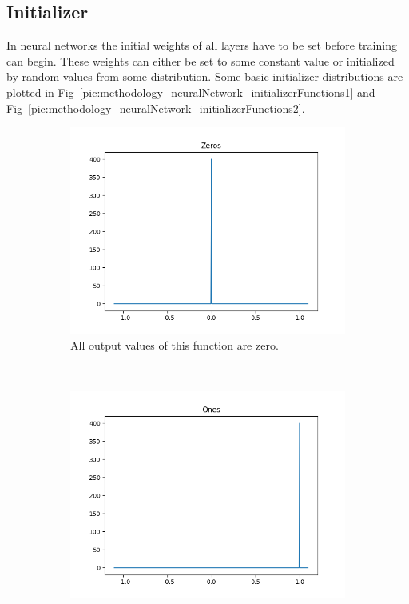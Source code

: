 \newpage

\subsection{Initializer}
In neural networks the initial weights of all layers have to be set before training can begin. These weights can either be set to some constant value or initialized by random values from some distribution. Some basic initializer distributions are plotted in Fig~\ref{pic:methodology_neuralNetwork_initializerFunctions1} and Fig~\ref{pic:methodology_neuralNetwork_initializerFunctions2}.

\newpage

\begin{figure}[h!]
	\centering
	\begin{subfigure}[t]{0.5\textwidth}
		\centering
		\includegraphics[width=\textwidth]{img/methodology_neuralNetwork_initializerFunctions_zeros.png}
		\caption{All output values of this function are zero.}
	\end{subfigure}%
	~ 
	\begin{subfigure}[t]{0.5\textwidth}
		\centering
		\includegraphics[width=\textwidth]{img/methodology_neuralNetwork_initializerFunctions_ones.png}

\end{subfigure}
\end{figure}
